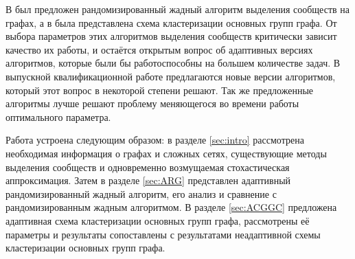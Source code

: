 В \cite{Ovelgoenne&Geyer-Schulz:2010} был предложен рандомизированный жадный алгоритм выделения сообществ на графах, а в \cite{Ovelgoenne&Geyer-Schulz:2012b} была представлена схема кластеризации основных групп графа. От выбора параметров этих алгоритмов выделения сообществ критически зависит качество их работы, и остаётся открытым вопрос об адаптивных версиях алгоритмов, которые были бы работоспособны на большем количестве задач. В выпускной квалификационной работе предлагаются новые версии алгоритмов, который этот вопрос в некоторой степени решают. Так же предложенные алгоритмы лучше решают проблему меняющегося во времени работы оптимального параметра.

Работа устроена следующим образом: в разделе \ref{sec:intro} рассмотрена необходимая информация о графах и сложных сетях, существующие методы выделения сообществ и одновременно возмущаемая стохастическая аппроксимация. Затем в разделе \ref{sec:ARG} представлен адаптивный рандомизированный жадный алгоритм, его анализ и сравнение с рандомизированным жадным алгоритмом. В разделе \ref{sec:ACGGC} предложена адаптивная схема кластеризации основных групп графа, рассмотрены её параметры и результаты сопоставлены с результатами неадаптивной схемы кластеризации основных групп графа.